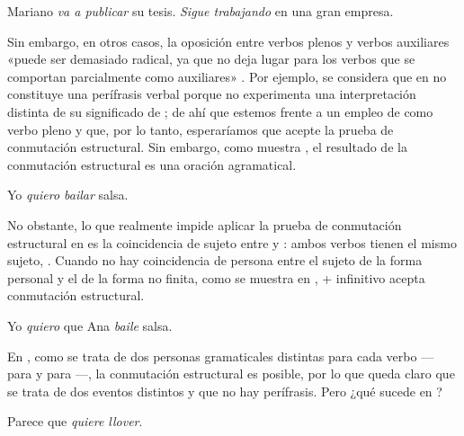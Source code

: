 \begin{exe}
  \ex\label{ex:11-mariano} Mariano \textit{va a publicar} su tesis.
  \ex\label{ex:11-sigue} \textit{Sigue trabajando} en una gran empresa.
\end{exe}

Sin embargo, en otros casos, la oposición entre verbos plenos y verbos
auxiliares «puede ser demasiado radical, ya que no deja lugar para los verbos que
se comportan parcialmente como auxiliares» \parencite{bosque2019}. Por ejemplo,
se considera que  en  no constituye una
perífrasis verbal porque no experimenta una interpretación distinta de su
significado de ; de ahí que estemos frente a un empleo de
 como verbo pleno y que, por lo tanto, esperaríamos que acepte la
prueba de conmutación estructural. Sin embargo, como muestra
, el resultado de la conmutación estructural es una oración
agramatical.

\begin{exe}
  \ex\label{ex:11-salsa}
    \begin{xlist}
      \ex\label{ex:11-salsa-a} Yo \textit{quiero bailar} salsa.
    \end{xlist}
\end{exe}

No obstante, lo que realmente impide aplicar la prueba de conmutación estructural
en  es la coincidencia de sujeto entre  y
: ambos verbos tienen el mismo sujeto, . Cuando no hay
coincidencia de persona entre el sujeto de la forma personal y el de la forma no
finita, como se muestra en ,  + infinitivo acepta
conmutación estructural.

\begin{exe}
  \ex\label{ex:11-ana} Yo \textit{quiero} que Ana \textit{baile} salsa.
\end{exe}

En , como se trata de dos personas gramaticales distintas para
cada verbo --- para  y  para
---, la conmutación estructural es posible, por lo que queda claro
que se trata de dos eventos distintos y que no hay perífrasis. Pero ¿qué sucede
en ?

\begin{exe}
  \ex\label{ex:11-llover} Parece que \textit{quiere llover}.
\end{exe}

